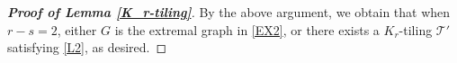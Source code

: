 \documentclass[11pt, a4paper]{article}
\theoremstyle{definition}
\newcommand{\<}{\subseteq}
\begin{document}
\begin{proof}[\bf Proof of Lemma \ref{K_r-tiling}]


By the above argument, we obtain that when $r-s=2$, either $G$ is the extremal graph in \ref{EX2}, or there exists a $K_r$-tiling $\mathcal{T}'$ satisfying \ref{L2}, as desired. %
\end{proof}


\end{document}
